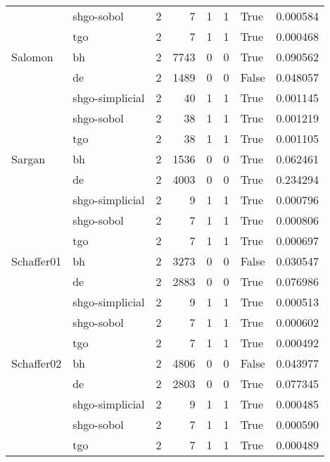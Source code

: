 \begin{longtable}{llrrrrlr}
         & shgo-sobol &     2 &        7 &      1 &       1 &    True &    0.000584 \\
         & tgo &     2 &        7 &      1 &       1 &    True &    0.000468 \\
Salomon & bh &     2 &     7743 &      0 &       0 &    True &    0.090562 \\
         & de &     2 &     1489 &      0 &       0 &   False &    0.048057 \\
         & shgo-simplicial &     2 &       40 &      1 &       1 &    True &    0.001145 \\
         & shgo-sobol &     2 &       38 &      1 &       1 &    True &    0.001219 \\
         & tgo &     2 &       38 &      1 &       1 &    True &    0.001105 \\
Sargan & bh &     2 &     1536 &      0 &       0 &    True &    0.062461 \\
         & de &     2 &     4003 &      0 &       0 &    True &    0.234294 \\
         & shgo-simplicial &     2 &        9 &      1 &       1 &    True &    0.000796 \\
         & shgo-sobol &     2 &        7 &      1 &       1 &    True &    0.000806 \\
         & tgo &     2 &        7 &      1 &       1 &    True &    0.000697 \\
Schaffer01 & bh &     2 &     3273 &      0 &       0 &   False &    0.030547 \\
         & de &     2 &     2883 &      0 &       0 &    True &    0.076986 \\
         & shgo-simplicial &     2 &        9 &      1 &       1 &    True &    0.000513 \\
         & shgo-sobol &     2 &        7 &      1 &       1 &    True &    0.000602 \\
         & tgo &     2 &        7 &      1 &       1 &    True &    0.000492 \\
Schaffer02 & bh &     2 &     4806 &      0 &       0 &   False &    0.043977 \\
         & de &     2 &     2803 &      0 &       0 &    True &    0.077345 \\
         & shgo-simplicial &     2 &        9 &      1 &       1 &    True &    0.000485 \\
         & shgo-sobol &     2 &        7 &      1 &       1 &    True &    0.000590 \\
         & tgo &     2 &        7 &      1 &       1 &    True &    0.000489 \\

\end{longtable}
